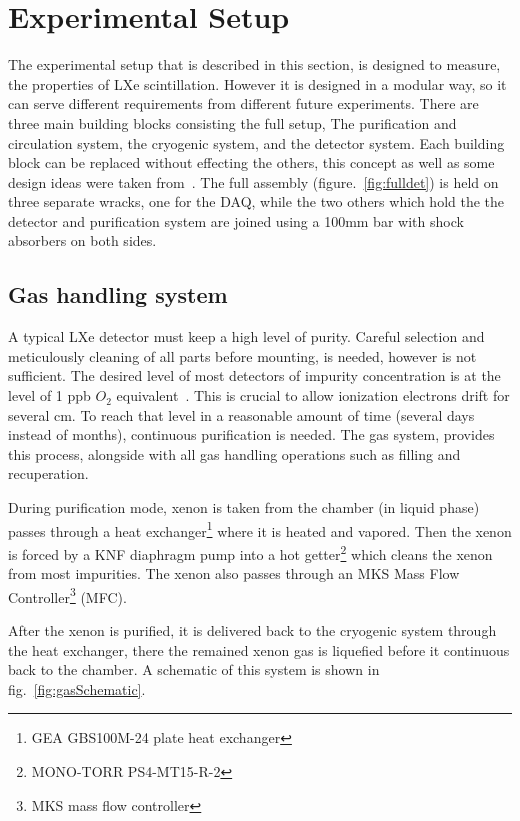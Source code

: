 \section{Experimental Setup}
\label{expSetup}
The experimental setup that is described in this section, is designed to measure, the properties of LXe scintillation. However it is designed in a modular way, so it can serve different requirements from different future experiments. There are three main building blocks consisting the full setup, The purification and circulation system, the cryogenic system, and the detector system. Each building block can be replaced without effecting the others, this concept as well as some design ideas were taken from~\cite{Giboni}. The full assembly (figure.~\ref{fig:fulldet}) is held on three separate wracks, one for the DAQ, while the two others which hold the the detector and purification system are joined using a 100mm bar with shock absorbers on both sides.   

\subsection{Gas handling system}
\label{subsec:gas}

A typical LXe detector must keep a high level of purity. Careful selection and meticulously cleaning of all parts before mounting, is needed, however is not sufficient. The desired level of most detectors of impurity concentration is at the level of 1 ppb $O_2$ equivalent~\cite{Aprile:2009dv}. This is crucial to allow ionization electrons drift for several cm. To reach that level in a reasonable amount of time (several days instead of months), continuous purification is needed. The gas system, provides this process, alongside with all gas handling operations such as filling and recuperation.

During purification mode, xenon is taken from the chamber (in liquid phase)
passes through a heat exchanger\footnote{GEA GBS100M-24 plate heat exchanger} where it is heated and vapored. Then the xenon is forced by a KNF diaphragm pump into a hot getter\footnote{MONO-TORR
PS4-MT15-R-2} which cleans the xenon from most impurities. The xenon
also passes through an MKS Mass Flow Controller\footnote{MKS mass flow controller} (MFC). 

After the xenon is purified, it is delivered back to the cryogenic system through the heat exchanger, there the remained xenon gas is liquefied before it continuous back to the chamber. A schematic of this system is shown in fig.~\ref{fig:gasSchematic}.


